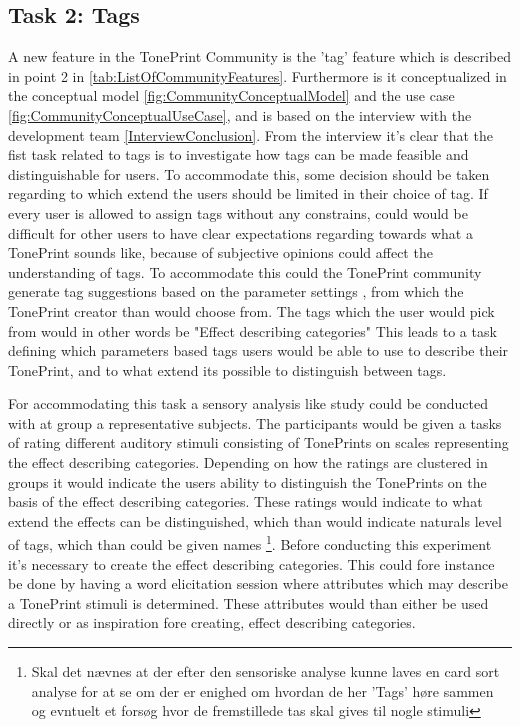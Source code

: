 \subsection{Task 2: Tags}
\label{Task2}

A new feature in the TonePrint Community is the 'tag' feature which is described in point 2 in \autoref{tab:ListOfCommunityFeatures}. Furthermore is it conceptualized in the conceptual model \autoref{fig:CommunityConceptualModel} and the use case \autoref{fig:CommunityConceptualUseCase}, and is based on the interview  with the development team \autoref{InterviewConclusion}. From the interview it's clear that the fist task related to tags is to investigate how tags can be made feasible and distinguishable for users. To accommodate this, some decision should be taken regarding to which extend the users should be limited in their choice of tag. If every user is allowed to assign tags without any constrains, could would be difficult for other users to have clear expectations regarding towards what a TonePrint sounds like, because of subjective opinions could affect the understanding of tags. To accommodate this could the TonePrint community generate tag suggestions based on the parameter settings , from which the TonePrint creator than would choose from. The tags which the user would pick from would in other words be "Effect describing categories" This leads to a task defining which parameters based tags users would be able to use to describe their TonePrint, and to what extend its possible to distinguish between tags.

\noindent
For accommodating this task a sensory analysis like study could be conducted with at group a representative subjects. The participants would be given a tasks of rating different auditory stimuli consisting of TonePrints on scales representing the effect describing categories. Depending on how the ratings are clustered in groups it would indicate the users ability to distinguish the TonePrints on the basis of the effect describing categories. These ratings would indicate to what extend the effects can be distinguished, which than would indicate naturals level of tags, which than could be given names \footnote{Skal det nævnes at der efter den sensoriske analyse kunne laves en card sort analyse for at se om der er enighed om hvordan de her 'Tags' høre sammen og evntuelt et forsøg hvor de fremstillede tas skal gives til nogle stimuli}. Before conducting this experiment it's necessary to create the effect describing categories. This could fore instance be done by having a word elicitation session where attributes which may describe a TonePrint stimuli is determined. These attributes would than either be used directly or as inspiration fore creating, effect describing categories.\\

